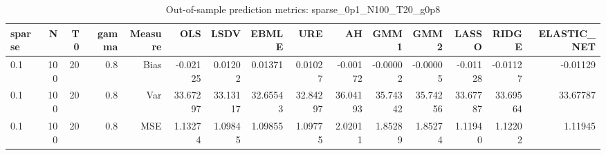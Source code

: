 \begin{table}[!htbp]\centering
\caption{Out-of-sample prediction metrics: sparse_0p1_N100_T20_g0p8}
\label{tab:table3_sparse_0p1_N100_T20_g0p8}
\begin{tabular}{lrrrrrrrrrrrrrr}
\hline
sparse & N & T0 & gamma & Measure & OLS & LSDV & EBMLE & URE & AH & GMM1 & GMM2 & LASSO & RIDGE & ELASTIC_NET \\
\hline
0.1 & 100 & 20 & 0.8 & Bias & -0.02125 & 0.01202 & 0.01371 & 0.01027 & -0.00172 & -0.00002 & -0.00005 & -0.01128 & -0.01127 & -0.01129 \\
0.1 & 100 & 20 & 0.8 & Var & 33.67297 & 33.13117 & 32.65543 & 32.84297 & 36.04193 & 35.74342 & 35.74256 & 33.67787 & 33.69564 & 33.67787 \\
0.1 & 100 & 20 & 0.8 & MSE & 1.13274 & 1.09845 & 1.09855 & 1.09775 & 2.02011 & 1.85289 & 1.85274 & 1.11940 & 1.12202 & 1.11945 \\
\hline
\end{tabular}
\end{table}

